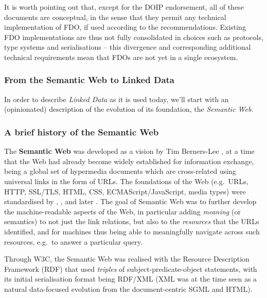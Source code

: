 It is worth pointing out that, except for the DOIP endorsement, all of these documents are conceptual, in the sense that they permit any technical implementation of FDO, if used according to the recommendations. 
Existing FDO implementations \cite{wittenburgFAIRDigitalObject2022b} are thus not fully consolidated in choices such as protocols, type systems and serialisations -- this divergence and corresponding additional technical requirements mean that FDOs are not yet in a single ecosystem.


\subsubsection{From the Semantic Web to Linked Data}\label{ch3:ld}

In order to describe \emph{Linked Data} as it is used today, we'll start with an (opinionated) description of the evolution of its foundation, the \emph{Semantic Web}.

\subsubsection*{A brief history of the Semantic Web}\label{ch3:semweb}

The \textbf{Semantic Web} was developed as a vision by Tim Berners-Lee \cite{berners-leeWeavingWebOriginal1999}, at a time that the Web had already become widely established for information exchange, being a global set of hypermedia documents which are cross-related using universal links in the form of URLs. The foundations of the Web (e.g.~URLs, HTTP, SSL/TLS, HTML, CSS, ECMAScript/JavaScript, media types) were standardised by , ,  and later . The goal of Semantic Web was to further develop the machine-readable aspects of the Web, in particular adding \emph{meaning} (or semantics) to not just the link relations, but also to the \emph{resources} that the URLs identified, and for machines thus being able to meaningfully navigate across such resources, e.g.~to answer a particular query.

Through W3C, the Semantic Web was realised with the Resource Description Framework (RDF) \cite{w3-rdf11-primer} that used \emph{triples} of subject-predicate-object statements, with its initial serialisation format \cite{w3-rdf-syntax99} being RDF/XML (XML was at the time seen as a natural data-focused evolution from the document-centric SGML and HTML).

